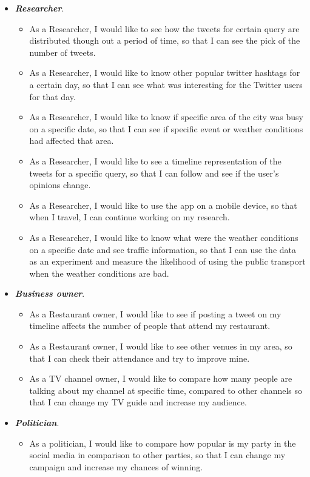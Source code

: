 \documentclass{l4proj}
\begin{document}
\begin{itemize}%
	\item \textbf{\textit{Researcher}}.
	\begin{itemize}
		\item As a Researcher, I would like to see how the tweets for certain query are distributed though out a period of time, so that I can see the pick of the number of tweets.
		\item As a Researcher, I would like to know other popular twitter hashtags for a certain day, so that I can see what was interesting for the Twitter users for that day.
		\item As a Researcher, I would like to know if specific area of the city was busy on a specific date, so that I can see if specific event or weather conditions had affected that area.
		\item As a Researcher, I would like to see a timeline representation of the tweets for a specific query, so that I can follow and see if the user’s opinions change.
		\item As a Researcher, I would like to use the app on a mobile device, so that when I travel, I can continue working on my research.
		\item As a Researcher, I would like to know what were the weather conditions on a specific date and see traffic information, so that I can use the data as an experiment and measure the likelihood of using the public transport when the weather conditions are bad. 
	\end{itemize}
	
	\item \textbf{\textit{Business owner}}.
	\begin{itemize}
		\item As a Restaurant owner, I would like to see if posting a tweet on my timeline affects the number of people that attend my restaurant.
		\item As a Restaurant owner, I would like to see other venues in my area, so that I can check their attendance and try to improve mine.
		\item As a TV channel owner, I would like to compare how many people are talking about my channel at specific time, compared to other channels so that I can change my TV guide and increase my audience.
	\end{itemize}
	
	\item \textbf{\textit{Politician}}.
	\begin{itemize}
		\item As a politician, I would like to compare how popular is my party in the social media in comparison to other parties, so that I can change my campaign and increase my chances of winning.
	\end{itemize}
	

\end{itemize}
\end{document}
